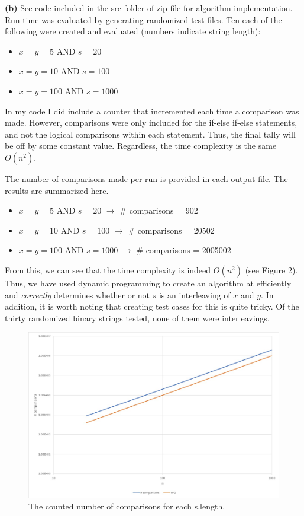 \documentclass[11pt]{article}
\renewcommand\part[1]{\vspace{.10in}\textbf{(#1)}}
\begin{document}
\part{b}
See code included in the src folder of zip file for algorithm implementation. Run time was evaluated by generating randomized test files. Ten each of the following were created and evaluated (numbers indicate string length):
\begin{itemize}
\item $x=y=5$ AND $s=20$
\item $x=y=10$ AND $s=100$
\item $x=y=100$ AND $s=1000$
\end{itemize}
In my code I did include a counter that incremented each time a comparison was made. However, comparisons were only included for the if-else if-else statements, and not the logical comparisons within each statement. Thus, the final tally will be off by some constant value. Regardless, the time complexity is the same $O(n^2)$.

The number of comparisons made per run is provided in each output file. The results are summarized here.
\begin{itemize}
\item $x=y=5$ AND $s=20$ $\longrightarrow$ \# comparisons = 902
\item $x=y=10$ AND $s=100$ $\longrightarrow$ \# comparisons = 20502
\item $x=y=100$ AND $s=1000$ $\longrightarrow$ \# comparisons = 2005002
\end{itemize}

From this, we can see that the time complexity is indeed $O(n^2)$ (see Figure 2). Thus, we have used dynamic programming to create an algorithm at efficiently and \textit{correctly} determines whether or not $s$ is an interleaving of $x$ and $y$. In addition, it is worth noting that creating test cases for this is quite tricky. Of the thirty randomized binary strings tested, none of them were interleavings.

\begin{figure}[!htbp]
  \includegraphics[width=\linewidth]{Untitled.png}
  \caption{The counted number of comparisons for each s.length.}
\end{figure}
\end{document}
